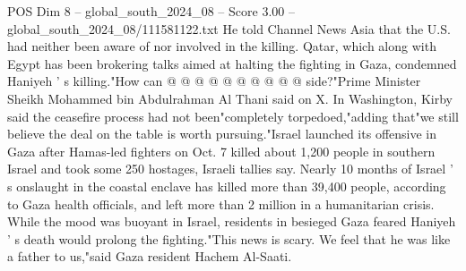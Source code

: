 \begin{textsample}{POS Dim 8 – global\_south\_2024\_08 – Score 3.00 – global\_south\_2024\_08/111581122.txt}
He told Channel News Asia that the U.S. had neither been aware of nor involved in the killing.
Qatar, which along with Egypt has been brokering talks aimed at halting the fighting in Gaza, condemned Haniyeh ' s killing."How can @ @ @ @ @ @ @ @ @ @ side?"Prime Minister Sheikh Mohammed bin Abdulrahman Al Thani said on X.
In Washington, Kirby said the ceasefire process had not been"completely torpedoed,"adding that"we still believe the deal on the table is worth pursuing."Israel launched its offensive in Gaza after Hamas-led fighters on Oct. 7 killed about 1,200 people in southern Israel and took some 250 hostages, Israeli tallies say.
Nearly 10 months of Israel ' s onslaught in the coastal enclave has killed more than 39,400 people, according to Gaza health officials, and left more than 2 million in a humanitarian crisis.
While the mood was buoyant in Israel, residents in besieged Gaza feared Haniyeh ' s death would prolong the fighting."This news is scary.
We feel that he was like a father to us,"said Gaza resident Hachem Al-Saati.

\end{textsample}
